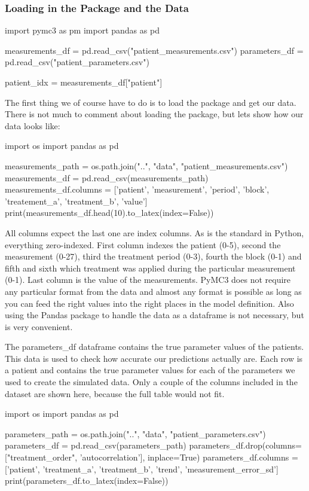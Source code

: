 \documentclass[12pt,a4paper,leqno]{report}
\theoremstyle{plain}
\theoremstyle{definition}
\theoremstyle{remark}
\begin{document}
\subsubsection{Loading in the Package and the Data}

\bigskip
\begin{pyverbatim}
import pymc3 as pm
import pandas as pd

measurements_df = pd.read_csv("patient_measurements.csv")
parameters_df = pd.read_csv("patient_parameters.csv")

patient_idx = measurements_df["patient"]
\end{pyverbatim}
\bigskip

The first thing we of course have to do is to load the package and get our data. There is
not much to comment about loading the package, but lets show how our data looks like:

\bigskip
\begin{pycode}
import os
import pandas as pd

measurements_path = os.path.join("..", "data", "patient_measurements.csv")
measurements_df = pd.read_csv(measurements_path)
measurements_df.columns = ['patient', 'measurement', 'period', 'block',
'treatement_a', 'treatment_b', 'value']
print(measurements_df.head(10).to_latex(index=False))
\end{pycode}
\bigskip

All columns expect the last one are index columns. As is the standard in Python, everything
zero-indexed. First column indexes the patient (0-5), second the
measurement (0-27), third the treatment period (0-3), fourth the block (0-1) and fifth
and sixth which treatment was applied during the particular measurement (0-1). Last
column is the value of the measurements. PyMC3 does not require any particular format from the
data and almost any format is possible as long as you can feed the right values into
the right places in the model definition. Also using the Pandas package to handle the
data as a dataframe is not necessary, but is very convenient.

The parameters\_df dataframe contains the true parameter values of the patients. This data is used to
check how accurate our predictions actually are. Each row is a patient and contains the
true parameter values for each of the parameters we used to create the simulated data.
Only a couple of the columns included in the dataset are shown here, because the full
table would not fit.

\bigskip
\begin{pycode}
import os
import pandas as pd

parameters_path = os.path.join("..", "data", "patient_parameters.csv")
parameters_df = pd.read_csv(parameters_path)
parameters_df.drop(columns=["treatment_order", 'autocorrelation'], inplace=True)
parameters_df.columns = ['patient', 'treatment_a', 'treatment_b', 'trend', 'measurement_error_sd']
print(parameters_df.to_latex(index=False))
\end{pycode}
\bigskip
\end{document}
